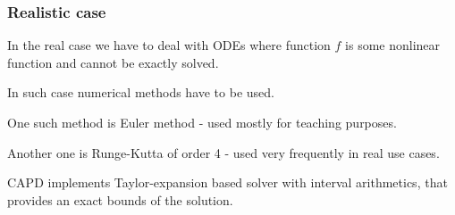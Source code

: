 \documentclass[aspectratio=169]{beamer}
\let\tempone\itemize
\let\temptwo\enditemize
\renewenvironment{itemize}{\tempone\addtolength{\itemsep}{0.5\baselineskip}}{\temptwo}
\begin{document}
\begin{frame}
\frametitle{Realistic case}

    \begin{itemize}
        \item<1-> In the real case we have to deal with ODEs where function $f$ is some nonlinear function and cannot be exactly solved.
        \item<2-> In such case numerical methods have to be used.
        \item<3-> One such method is Euler method - used mostly for teaching purposes.
        \item<4-> Another one is Runge-Kutta of order 4 - used very frequently in real use cases.
        \item<5-> CAPD implements Taylor-expansion based solver with interval arithmetics, that provides an exact bounds of the solution.
    \end{itemize}

\end{frame}
\end{document}
